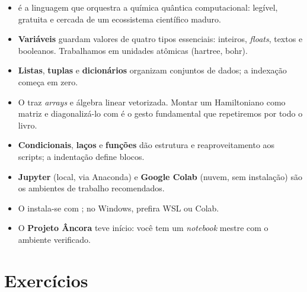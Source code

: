 \begin{itemize}[leftmargin=*]
  \item \python{} é a linguagem que orquestra a química quântica computacional:
        legível, gratuita e cercada de um ecossistema científico maduro.
  \item \textbf{Variáveis} guardam valores de quatro tipos essenciais: inteiros,
        \emph{floats}, textos e booleanos. Trabalhamos em unidades atômicas
        (hartree, bohr).
  \item \textbf{Listas}, \textbf{tuplas} e \textbf{dicionários} organizam
        conjuntos de dados; a indexação começa em zero.
  \item O \numpy{} traz \emph{arrays} e álgebra linear vetorizada. Montar um
        Hamiltoniano como matriz e diagonalizá-lo com  é o
        gesto fundamental que repetiremos por todo o livro.
  \item \textbf{Condicionais}, \textbf{laços} e \textbf{funções} dão estrutura e
        reaproveitamento aos scripts; a indentação define blocos.
  \item \textbf{Jupyter} (local, via Anaconda) e \textbf{Google Colab} (nuvem,
        sem instalação) são os ambientes de trabalho recomendados.
  \item O \pyscf{} instala-se com ; no Windows, prefira WSL
        ou Colab.
  \item O \textbf{Projeto Âncora} teve início: você tem um \emph{notebook} mestre
        com o ambiente verificado.
\end{itemize}

\section*{Exercícios}

